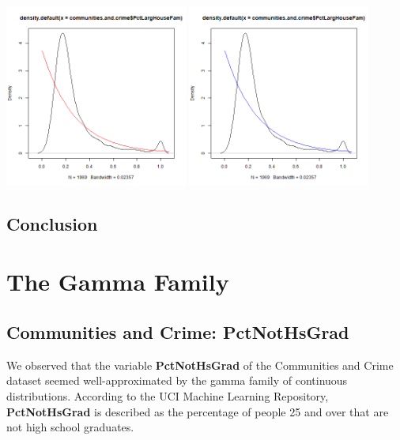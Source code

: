\documentclass[12pt, letterpaper]{report}
\begin{document}
\begin{center}
\includegraphics[width=0.45\textwidth]{exponential/PctLargHouseFam_mle}
\includegraphics[width=0.45\textwidth]{exponential/PctLargHouseFam_mm}
\end{center}

\section{Conclusion}


\maketitle
\chapter{The Gamma Family}
\section{Communities and Crime: PctNotHsGrad}

We observed that the variable \textbf{PctNotHsGrad} of the Communities and Crime dataset seemed well-approximated by the gamma family of continuous distributions.
According to the UCI Machine Learning Repository, \textbf{PctNotHsGrad} is described as the percentage of people 25 and over that are not high school graduates.
\end{document}
